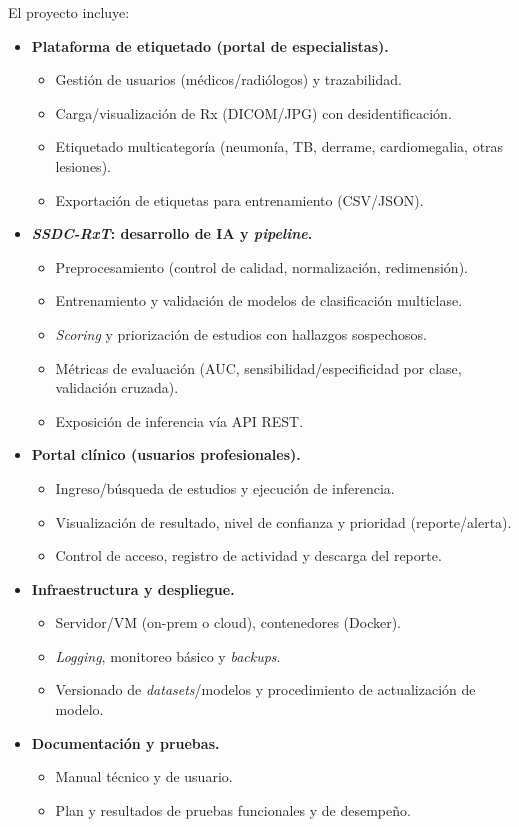 \documentclass[
11pt, %
]{charter}
\begin{document}
El proyecto incluye:
\begin{itemize}
  \item \textbf{Plataforma de etiquetado (portal de especialistas).}
    \begin{itemize}
      \item Gestión de usuarios (médicos/radiólogos) y trazabilidad.
      \item Carga/visualización de Rx (DICOM/JPG) con desidentificación.
      \item Etiquetado multicategoría (neumonía, TB, derrame, cardiomegalia, otras lesiones).
      \item Exportación de etiquetas para entrenamiento (CSV/JSON).
    \end{itemize}
  \item \textbf{\textit{SSDC-RxT}: desarrollo de IA y \textit{pipeline}.}
    \begin{itemize}
      \item Preprocesamiento (control de calidad, normalización, redimensión).
      \item Entrenamiento y validación de modelos de clasificación multiclase.
      \item \textit{Scoring} y priorización de estudios con hallazgos sospechosos.
      \item Métricas de evaluación (AUC, sensibilidad/especificidad por clase, validación cruzada).
      \item Exposición de inferencia vía API REST.
    \end{itemize}
  \item \textbf{Portal clínico (usuarios profesionales).}
    \begin{itemize}
      \item Ingreso/búsqueda de estudios y ejecución de inferencia.
      \item Visualización de resultado, nivel de confianza y prioridad (reporte/alerta).
      \item Control de acceso, registro de actividad y descarga del reporte.
    \end{itemize}
  \item \textbf{Infraestructura y despliegue.}
    \begin{itemize}
      \item Servidor/VM (on-prem o cloud), contenedores (Docker).
      \item \textit{Logging}, monitoreo básico y \textit{backups}.
      \item Versionado de \textit{datasets}/modelos y procedimiento de actualización de modelo.
    \end{itemize}
  \item \textbf{Documentación y pruebas.}
    \begin{itemize}
      \item Manual técnico y de usuario.
      \item Plan y resultados de pruebas funcionales y de desempeño.
    \end{itemize}
\end{itemize}
\end{document}
